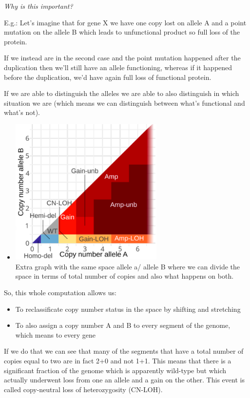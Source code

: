 \emph{Why is this important?}

E.g.: Let's imagine that for gene X we have one copy lost on allele A and a
point mutation on the allele B which leads to unfunctional product so full loss
of the protein.

If we instead are in the second case and the point mutation happened after the
duplication then we'll still have an allele functioning, whereas if it happened
before the duplication, we'd have again full loss of functional protein.

If we are able to distinguish the alleles we are able to also distinguish in
which situation we are (which means we can distinguish between what's functional
and what's not).

\begin{itemize}
\item
  \includegraphics[width=3.00903in,height=2.89861in]{image13.png}\\
  Extra graph
  with the same space allele a/ allele B where we can divide the space in terms
  of total number of copies and also what happens on both.
\end{itemize}

So, this whole computation allows us:

\begin{itemize}
\item
  To reclassificate copy number status in the space by shifting and stretching
\item
  To also assign a copy number A and B to every segment of the genome, which
  means to every gene
\end{itemize}

If we do that we can see that many of the segments that have a total number of
copies equal to two are in fact 2+0 and not 1+1. This means that there is a
significant fraction of the genome which is apparently wild-type but which
actually underwent loss from one an allele and a gain on the other. This event
is called copy-neutral loss of heterozygosity (CN-LOH).

